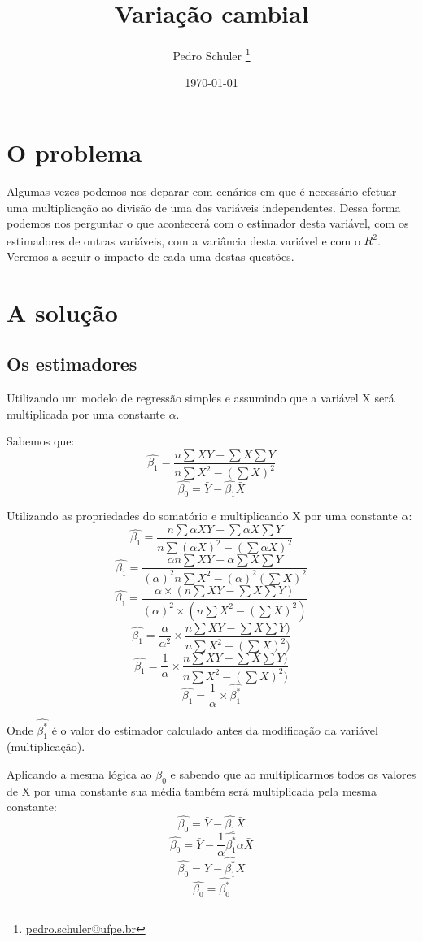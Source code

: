 \documentclass[12pt,a4paper,titlepage=false]{scrartcl}
\title{Variação cambial}
\author{Pedro Schuler \thanks{\href{mailto:pedro.schuler@ufpe.br}{pedro.schuler@ufpe.br}}}
\date{\today}
\begin{document}
\maketitle

\section{O problema}
Algumas vezes podemos nos deparar com cenários em que é necessário efetuar uma multiplicação ao divisão de uma das variáveis independentes. Dessa forma podemos nos perguntar o que acontecerá com o estimador desta variável, com os estimadores de outras variáveis, com a variância desta variável e com o \(\bar{R^{2}}\). Veremos a seguir o impacto de cada uma destas questões.

\section{A solução}

\subsection{Os estimadores}
Utilizando um modelo de regressão simples e assumindo que a variável X será multiplicada por uma constante \(\alpha\).

Sabemos que:
\[\hat{\beta_{1}} = \frac{n\sum{XY} - \sum{X}\sum{Y}}{n\sum{X^{2}} - (\sum{X})^{2}} \]
\[\hat{\beta_{0}} = \bar{Y} - \hat{\beta_{1}}\bar{X}\]

Utilizando as propriedades do somatório e multiplicando X por uma constante \(\alpha\):
\[\hat{\beta_{1}} = \frac{n\sum{\alpha XY} - \sum{\alpha X}\sum{Y}}{n\sum{(\alpha X)^2} - (\sum{\alpha X})^{2}}\]
\[\hat{\beta_{1}} = \frac{\alpha n\sum{XY} - \alpha \sum{X}\sum{Y}}{(\alpha)^2 n\sum{X^{2}} - (\alpha)^{2}(\sum{X})^{2}}\]
\[\hat{\beta_{1}} = \frac{\alpha \times (n\sum{XY} - \sum{X}\sum{Y})}{(\alpha)^2 \times (n\sum{X^{2}} - (\sum{X})^{2})}\]
\[\hat{\beta_{1}} = \frac{\alpha}{\alpha^{2}} \times \frac{n\sum{XY} - \sum{X}\sum{Y})}{n\sum{X^{2}} - (\sum{X})^{2})}\]
\[\hat{\beta_{1}} = \frac{1}{\alpha} \times \frac{n\sum{XY} - \sum{X}\sum{Y})}{n\sum{X^{2}} - (\sum{X})^{2})}\]
\[\hat{\beta_{1}} = \frac{1}{\alpha} \times \hat{\beta_{1}^{\ast}}\]

Onde \(\hat{\beta_{1}^{\ast}}\) é o valor do estimador calculado antes da modificação da variável (multiplicação).

Aplicando a mesma lógica ao \(\beta_{0}\) e sabendo que ao multiplicarmos todos os valores de X por uma constante sua média também será multiplicada pela mesma constante:
\[\hat{\beta_{0}} = \bar{Y} - \hat{\beta_{1}}\bar{X}\]
\[\hat{\beta_{0}} = \bar{Y} - \frac{1}{\alpha}\hat{\beta_{1}^{\ast}}\alpha\bar{X}\]
\[\hat{\beta_{0}} = \bar{Y} - \hat{\beta_{1}^{\ast}}\bar{X}\]
\[\hat{\beta_{0}} = \hat{\beta_{0}^{\ast}}\]
\end{document}
